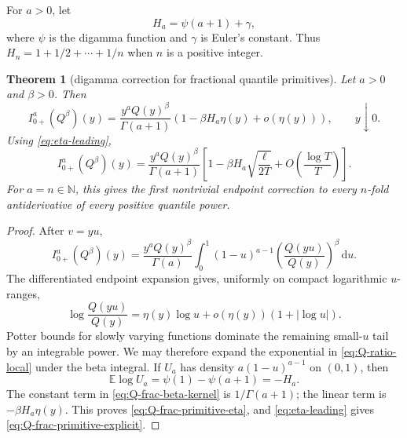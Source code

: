 \documentclass[11pt,oneside]{article}
\newtheorem{theorem}{Theorem}[section]
\theoremstyle{definition}
\newcommand{\Q}{Q}
\newcommand{\E}{\mathbb E}
\newcommand{\N}{\mathbb N}
\newcommand{\dd}{\,\mathrm d}
\begin{document}
For \(a>0\), let
\begin{equation}\label{eq:continuous-harmonic}
 H_a=\psi(a+1)+\gamma,
\end{equation}
where \(\psi\) is the digamma function and \(\gamma\) is Euler's constant.  Thus
\(H_n=1+1/2+\cdots+1/n\) when \(n\) is a positive integer.

\begin{theorem}[digamma correction for fractional quantile primitives]
\label{thm:Q-fractional-primitive-asymptotic}
Let \(a>0\) and \(\beta>0\).  Then
\begin{equation}\label{eq:Q-frac-primitive-eta}
 I_{0+}^{a}(\Q^\beta)(y)
 =\frac{y^a\Q(y)^\beta}{\Gamma(a+1)}
  \left(1-\beta H_a\eta(y)+o(\eta(y))\right),
 \qquad y\downarrow0.
\end{equation}
Using \eqref{eq:eta-leading},
\begin{equation}\label{eq:Q-frac-primitive-explicit}
 I_{0+}^{a}(\Q^\beta)(y)
 =\frac{y^a\Q(y)^\beta}{\Gamma(a+1)}
 \left[
  1-\beta H_a\sqrt{\frac{\ell}{2T}}
  +O\!\left(\frac{\log T}{T}\right)
 \right].
\end{equation}
For \(a=n\in\N\), this gives the first nontrivial endpoint correction to every
\(n\)-fold antiderivative of every positive quantile power.
\end{theorem}

\begin{proof}
After \(v=yu\),
\begin{equation}\label{eq:Q-frac-beta-kernel}
 I_{0+}^{a}(\Q^\beta)(y)
 =\frac{y^a\Q(y)^\beta}{\Gamma(a)}
  \int_0^1(1-u)^{a-1}
       \left(\frac{\Q(yu)}{\Q(y)}\right)^\beta\dd u.
\end{equation}
The differentiated endpoint expansion gives, uniformly on compact logarithmic
\(u\)-ranges,
\begin{equation}\label{eq:Q-ratio-local}
 \log\frac{\Q(yu)}{\Q(y)}
 =\eta(y)\log u+o(\eta(y))(1+|\log u|).
\end{equation}
Potter bounds for slowly varying functions dominate the remaining small-\(u\) tail by
an integrable power.  We may therefore expand the exponential in
\eqref{eq:Q-ratio-local} under the beta integral.  If \(U_a\) has density
\(a(1-u)^{a-1}\) on \((0,1)\), then
\begin{equation}\label{eq:beta-log-moment}
 \E\log U_a=\psi(1)-\psi(a+1)=-H_a.
\end{equation}
The constant term in \eqref{eq:Q-frac-beta-kernel} is
\(1/\Gamma(a+1)\); the linear term is \(-\beta H_a\eta(y)\).  This proves
\eqref{eq:Q-frac-primitive-eta}, and \eqref{eq:eta-leading} gives
\eqref{eq:Q-frac-primitive-explicit}.
\end{proof}
\end{document}
